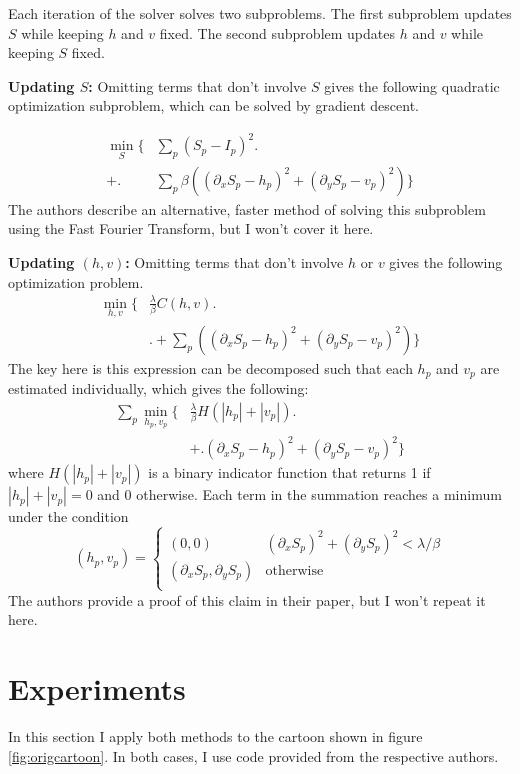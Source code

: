 \documentclass[10pt,twocolumn,letterpaper]{article}
\begin{document}
Each iteration of the solver solves two subproblems. The first subproblem updates $S$ while keeping $h$ and $v$ fixed. The second subproblem updates $h$ and $v$ while keeping $S$ fixed.

{\bf Updating $S$: } Omitting terms that don't involve $S$ gives the following quadratic optimization subproblem, which can be solved by gradient descent.

\begin{align*}
\min_{S} \Biggl\lbrace &\sum_p(S_p - I_p)^2 \Biggr.\\
+ \Biggl. &\sum_p\beta((\partial_xS_p - h_p)^2 + (\partial_yS_p - v_p)^2) \Biggr\rbrace
\end{align*}
The authors describe an alternative, faster method of solving this subproblem using the Fast Fourier Transform, but I won't cover it here.

{\bf Updating $(h, v)$: } Omitting terms that don't involve $h$ or $v$ gives the following optimization problem.
\begin{align*}
\min_{h,v} \Biggl\lbrace & \frac{\lambda}{\beta} C(h, v) \Biggl. \\ 
& \Biggl. + \sum_p((\partial_xS_p - h_p)^2 + (\partial_yS_p - v_p)^2) \Biggr\rbrace
\end{align*}
The key here is this expression can be decomposed such that each $h_p$ and $v_p$ are estimated individually, which gives the following:
\begin{align*}
\sum_p \min_{h_p,v_p} \Biggl\lbrace & \frac{\lambda}{\beta} H(|h_p| + |v_p|) \Biggr. \\
& + \Biggl. (\partial_xS_p - h_p)^2 + (\partial_yS_p - v_p)^2 \Biggr\rbrace
\end{align*}
where $H(|h_p| + |v_p|)$ is a binary indicator function that returns 1 if $|h_p| + |v_p| = 0$ and 0 otherwise. Each term in the summation reaches a minimum under the condition
\[ 
(h_p, v_p) =
\begin{cases} 
      (0, 0) & (\partial_xS_p)^2 + (\partial_yS_p)^2 < \lambda/\beta \\
      (\partial_xS_p, \partial_yS_p) & \text{otherwise} \\
   \end{cases}
\]
The authors provide a proof of this claim in their paper, but I won't repeat it here.

\section{Experiments}
In this section I apply both methods to the cartoon shown in figure \ref{fig:origcartoon}. In both cases, I use code provided from the respective authors.
\end{document}
